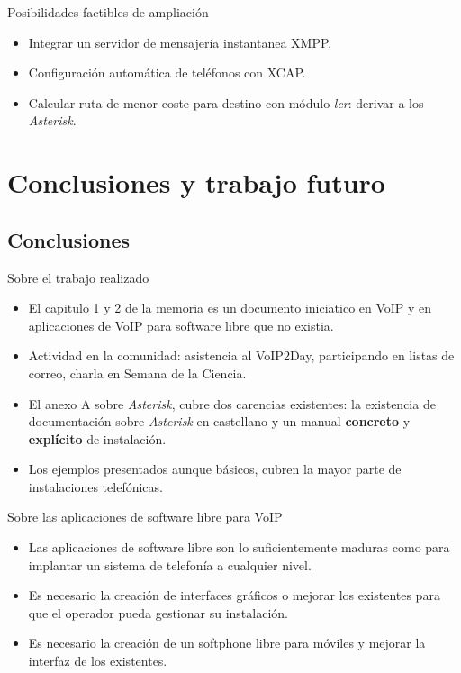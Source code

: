 \documentclass{beamer}
\begin{document}
\begin{frame}
  \begin{block}{Posibilidades factibles de ampliación}
    \begin{itemize}
    \item Integrar un servidor de mensajería instantanea XMPP.
    \item Configuración automática de teléfonos con XCAP.
    \item Calcular ruta de menor coste para destino con módulo \emph{lcr}: derivar a los \emph{Asterisk}.
    \end{itemize}
  \end{block}
\end{frame}



\section{Conclusiones y trabajo futuro}
\label{sec:concl-y-trab}

\subsection{Conclusiones}
\label{sec:conclusiones}

\begin{frame}
\begin{block}{Sobre el trabajo realizado}
  \begin{itemize}
  \item El capitulo 1 y 2 de la memoria es un documento iniciatico en VoIP y en aplicaciones de VoIP para software libre que no existia.
  \item Actividad en la comunidad: asistencia al VoIP2Day, participando en listas de correo, charla en Semana de la Ciencia.
  \item El anexo A sobre \emph{Asterisk}, cubre dos carencias existentes: la existencia de documentación sobre \emph{Asterisk} en castellano y un manual \textbf{concreto} y \textbf{explícito} de instalación.
  \item Los ejemplos presentados aunque básicos, cubren la mayor parte de instalaciones telefónicas.
  \end{itemize}
\end{block}
\end{frame}

\begin{frame}
  \begin{block}{Sobre las aplicaciones de software libre para VoIP}
    \begin{itemize}
    \item Las aplicaciones de software libre son lo suficientemente maduras como para implantar un sistema de telefonía a cualquier nivel.
    \item Es necesario la creación de interfaces gráficos o mejorar los existentes para que el operador pueda gestionar su instalación. 
    \item Es necesario la creación de un softphone libre para móviles y mejorar la interfaz de los existentes.
    \end{itemize}
  \end{block}
\end{frame}
\end{document}
